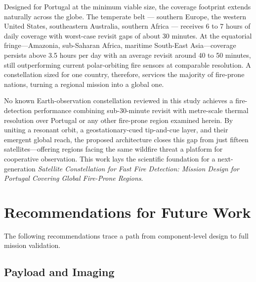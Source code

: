 Designed for Portugal at the minimum viable size, the coverage footprint extends naturally across the globe.  The temperate belt — southern Europe, the western United States, southeastern Australia, southern Africa — receives 6 to 7 hours of daily coverage with worst-case revisit gaps of about 30 minutes.  At the equatorial fringe---Amazonia, sub-Saharan Africa, maritime South-East Asia---coverage persists above 3.5 hours per day with an average revisit around 40 to 50 minutes, still outperforming current polar-orbiting fire sensors at comparable resolution.  A constellation sized for one country, therefore, services the majority of fire-prone nations, turning a regional mission into a global one.

No known Earth-observation constellation reviewed in this study achieves a fire-detection performance combining sub-30-minute revisit with metre-scale thermal resolution over Portugal or any other fire-prone region examined herein.  By uniting a resonant orbit, a geostationary-cued tip-and-cue layer, and their emergent global reach, the proposed architecture closes this gap from just fifteen satellites---offering regions facing the same wildfire threat a platform for cooperative observation.  This work lays the scientific foundation for a next-generation \emph{Satellite Constellation for Fast Fire Detection: Mission Design for Portugal Covering Global Fire-Prone Regions}.

\section{Recommendations for Future Work}\label{sec:conclusion-future}

The following recommendations trace a path from component-level design to full mission validation.

\subsection{Payload and Imaging}

